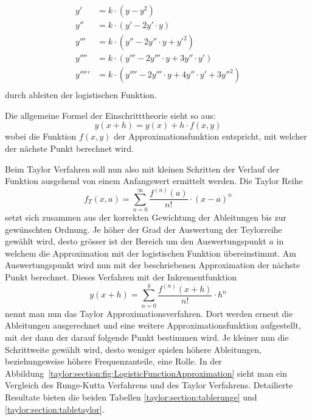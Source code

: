 \begin{equation}
\begin{aligned}
y'&=k\cdot (y-y^{2})\\
y''&=k\cdot (y'-2y'\cdot y)\\
y'''&=k\cdot (y''-2y''\cdot y+y'^{2})\\
y''''&=k\cdot (y'''-2y'''\cdot y+3y''\cdot y')\\
y'''''&=k\cdot (y''''-2y'''\cdot y+4y''\cdot y'+3y''^{2})\\
\end{aligned}
\end{equation}
durch ableiten der logistischen Funktion.

Die allgemeine Formel der Einschritttheorie sieht so aus:
\begin{equation}
y(x+h) = y(x) + h\cdot f(x,y)
\end{equation}
wobei die Funktion $f(x,y)$ der Approximationsfunktion entspricht, mit welcher der nächste Punkt berechnet wird.

Beim Taylor Verfahren soll nun also mit kleinen Schritten der Verlauf der Funktion ausgehend von einem Anfangswert ermittelt werden.
Die Taylor Reihe
\begin{equation}
f_{T}(x,a)
=
\sum_{n=0}^{\infty}{\frac{f^{(n)}(a)}{n!}}\cdot (x-a)^{n}
\label{taylor:section:taylor}
\end{equation}
setzt sich zusammen aus der korrekten Gewichtung der Ableitungen bis zur gewünschten Ordnung.
Je höher der Grad der Auswertung der Teylorreihe gewählt wird, desto grösser ist der Bereich um den Auswertungspunkt $a$ in welchem die Approximation mit der logistischen Funktion übereinstimmt.
Am Auswertungspunkt wird nun mit der beschriebenen Approximation der nächste Punkt berechnet.
Dieses Verfahren mit der Inkrementfunktion
\begin{equation}
y(x+h)
=
\sum_{n=0}^{g}{\frac{f^{(n)}(x+h)}{n!}}\cdot h^{n}
\label{taylor:section:taylorapproximation}
\end{equation}
nennt man nun das Taylor Approximationsverfahren.
Dort werden erneut die Ableitungen ausgerechnet und eine weitere Approximationsfunktion aufgestellt, mit der dann der darauf folgende Punkt bestimmen wird.
Je kleiner nun die Schrittweite gewählt wird, desto weniger spielen höhere Ableitungen, beziehungsweise höhere Frequenzanteile, eine Rolle.
In der Abbildung~\ref{taylor:section:fig:LogisticFunctionApproximation} sieht man ein Vergleich des Runge-Kutta Verfahrens und des Taylor Verfahrens.
Detailierte Resultate bieten die beiden Tabellen \ref{taylor:section:tablerunge} und \ref{taylor:section:tabletaylor}.

